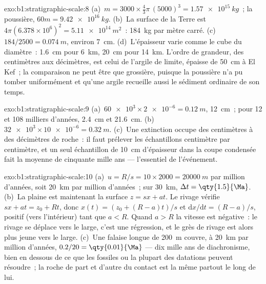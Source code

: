 \begin{solution}{exo:b1:stratigraphic-scale:8}
(a)~$m = 3000 \times \frac43\pi\,(5000)^3 = \qty{1.57e15}{kg}$~; la poussière,
$60m = \qty{9.42e16}{kg}$. (b)~La surface de la Terre est $4\pi(6.378\times10^6)^2
= \qty{5.11e14}{m^2}$~: \qty{184}{kg} par mètre carré. (c)~$184/2500 =
\qty{0.074}{m}$, environ \qty{7}{cm}. (d)~L'épaisseur varie comme le cube du
diamètre~: \qty{1.6}{cm} pour \qty{6}{km}, \qty{20}{cm} pour \qty{14}{km}. L'ordre
de grandeur, des centimètres aux décimètres, est celui de l'argile de limite,
épaisse de \qty{50}{cm} à El Kef~; la comparaison ne peut être que grossière, puisque la poussière
n'a pu tomber uniformément et qu'une argile recueille aussi le sédiment ordinaire de
son temps.
\end{solution}

\begin{solution}{exo:b1:stratigraphic-scale:9}
(a)~$\num{60e3} \times \num{2e-6} = \qty{0.12}{m}$, \qty{12}{cm}~; pour 12 et 108
milliers d'années, \qty{2.4}{cm} et \qty{21.6}{cm}. (b)~$\num{32e3} \times
\num{10e-6} = \qty{0.32}{m}$. (c)~Une extinction occupe des centimètres à des décimètres
de roche~: il faut prélever les échantillons centimètre par centimètre, et un seul échantillon
de \qty{10}{cm} d'épaisseur dans la coupe condensée fait la moyenne de cinquante mille ans ---
l'essentiel de l'événement.
\end{solution}

\begin{solution}{exo:b1:stratigraphic-scale:10}
(a)~$u = R/s = 10 \times 2000 = \qty{20000}{m}$ par million d'années,
soit \qty{20}{km} par million d'années~; sur \qty{30}{km}, $\Delta t = \qty{1.5}{\Ma}$.
(b)~La plaine est maintenant la surface $z = s x + a t$. Le rivage vérifie
$s x + a t = z_0 + R t$, donc $x(t) = (z_0 + (R - a)t)/s$ et
$\mathrm dx/\mathrm dt = (R - a)/s$, positif (vers l'intérieur) tant que $a < R$. Quand
$a > R$ la vitesse est négative~: le rivage se déplace vers le large, c'est une régression, et
le grès de rivage est alors plus jeune vers le large. (c)~Une falaise longue de \qty{200}{m} couvre,
à \qty{20}{km} par million d'années, $0.2/20 = \qty{0.01}{\Ma}$ --- dix mille
ans de diachronisme, bien en dessous de ce que les fossiles ou la plupart des datations peuvent résoudre~; la roche de
part et d'autre du contact est la même partout le long de lui.
\end{solution}

